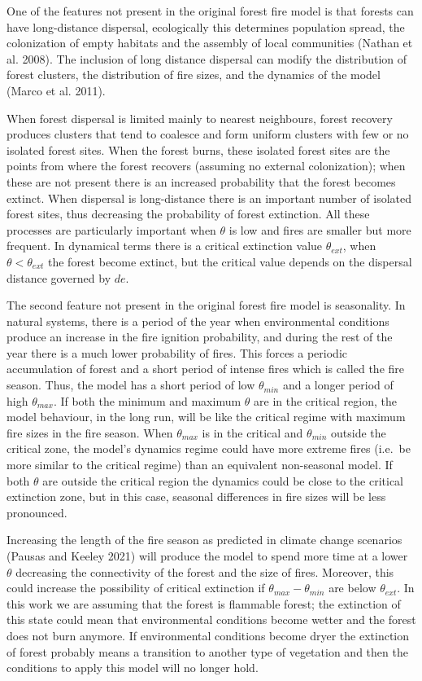 \documentclass[
]{article}
\begin{document}
One of the features not present in the original forest fire model is
that forests can have long-distance dispersal, ecologically this
determines population spread, the colonization of empty habitats and the
assembly of local communities (Nathan et al. 2008). The inclusion of
long distance dispersal can modify the distribution of forest clusters,
the distribution of fire sizes, and the dynamics of the model (Marco et
al. 2011).

When forest dispersal is limited mainly to nearest neighbours, forest
recovery produces clusters that tend to coalesce and form uniform
clusters with few or no isolated forest sites. When the forest burns,
these isolated forest sites are the points from where the forest
recovers (assuming no external colonization); when these are not present
there is an increased probability that the forest becomes extinct. When
dispersal is long-distance there is an important number of isolated
forest sites, thus decreasing the probability of forest extinction. All
these processes are particularly important when \(\theta\) is low and
fires are smaller but more frequent. In dynamical terms there is a
critical extinction value \(\theta_{ext}\), when
\(\theta < \theta_{ext}\) the forest become extinct, but the critical
value depends on the dispersal distance governed by \(de\).

The second feature not present in the original forest fire model is
seasonality. In natural systems, there is a period of the year when
environmental conditions produce an increase in the fire ignition
probability, and during the rest of the year there is a much lower
probability of fires. This forces a periodic accumulation of forest and
a short period of intense fires which is called the fire season. Thus,
the model has a short period of low \(\theta_{min}\) and a longer period
of high \(\theta_{max}\). If both the minimum and maximum \(\theta\) are
in the critical region, the model behaviour, in the long run, will be
like the critical regime with maximum fire sizes in the fire season.
When \(\theta_{max}\) is in the critical and \(\theta_{min}\) outside
the critical zone, the model's dynamics regime could have more extreme
fires (i.e.~be more similar to the critical regime) than an equivalent
non-seasonal model. If both \(\theta\) are outside the critical region
the dynamics could be close to the critical extinction zone, but in this
case, seasonal differences in fire sizes will be less pronounced.

Increasing the length of the fire season as predicted in climate change
scenarios (Pausas and Keeley 2021) will produce the model to spend more
time at a lower \(\theta\) decreasing the connectivity of the forest and
the size of fires. Moreover, this could increase the possibility of
critical extinction if \(\theta_{max} - \theta_{min}\) are below
\(\theta_{ext}\). In this work we are assuming that the forest is
flammable forest; the extinction of this state could mean that
environmental conditions become wetter and the forest does not burn
anymore. If environmental conditions become dryer the extinction of
forest probably means a transition to another type of vegetation and
then the conditions to apply this model will no longer hold.
\end{document}
